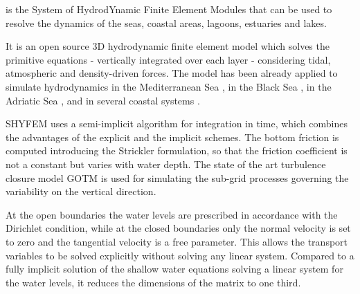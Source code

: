 
%
%
%
%
%
%
%

\shy{} is the System of HydrodYnamic Finite Element Modules that can be used to 
resolve the dynamics of the seas, coastal areas, lagoons, estuaries and lakes. 

It is an open source 3D hydrodynamic finite element model
which solves the primitive equations - vertically integrated over each layer -
considering tidal, atmospheric and density-driven forces. 
The model has been already applied 
to simulate hydrodynamics in the Mediterranean Sea \cite{ferrarin13:med,
Ferrarin2018_mmba}, in the Black Sea \cite{Bajo14:black}, in the Adriatic Sea 
\cite{bella10:3d,Ferrarin2016_mgsed,Ferrarin2017_adlag}, and in several coastal 
systems \cite{Umgiesser1410lags}.


SHYFEM uses a semi-implicit algorithm for integration in time, which combines the advantages of the explicit and the implicit schemes. The bottom friction is computed introducing the Strickler formulation, so that the friction coefficient is not a constant but varies with water depth. The state of the art turbulence closure model GOTM is used for simulating the sub-grid processes governing the variability on the vertical direction.

At the open boundaries the water levels are prescribed in accordance with the Dirichlet condition, while at the closed boundaries only the normal velocity is set to zero and the tangential velocity is a free parameter. This allows the transport variables to be solved explicitly without solving any linear system. Compared to a fully implicit solution of the shallow water equations solving a linear system for the water levels, it reduces the dimensions of the matrix to one third.

